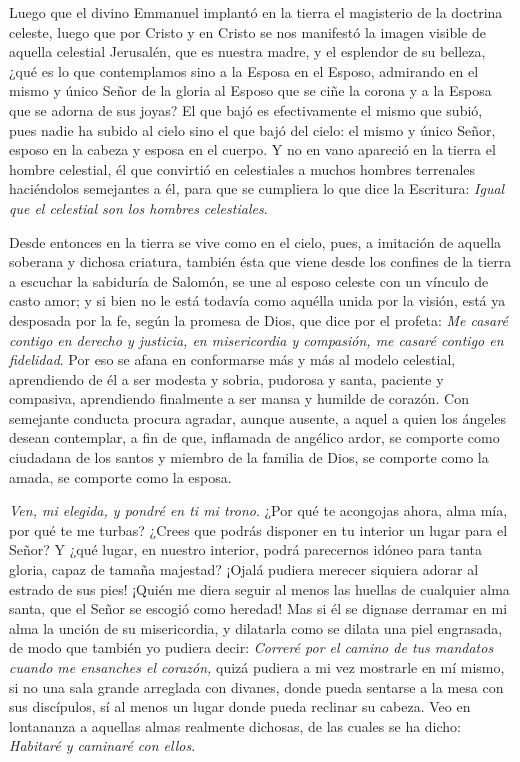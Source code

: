 				\begin{body}
					Luego que el divino Emmanuel implantó en la tierra el magisterio de la doctrina celeste, luego que por Cristo y en Cristo se nos manifestó la imagen visible de aquella celestial Jerusalén, que es nuestra madre, y el esplendor de su belleza, ¿qué es lo que contemplamos sino a la Esposa en el Esposo, admirando en el mismo y único Señor de la gloria al Esposo que se ciñe la corona y a la Esposa que se adorna de sus joyas? El que bajó es efectivamente el mismo que subió, pues nadie ha subido al cielo sino el que bajó del cielo: el mismo y único Señor, esposo en la cabeza y esposa en el cuerpo. Y no en vano apareció en la tierra el hombre celestial, él que convirtió en celestiales a muchos hombres terrenales haciéndolos semejantes a él, para que se cumpliera lo que dice la Escritura: \emph{Igual que el celestial son los hombres celestiales}.
					
					Desde entonces en la tierra se vive como en el cielo, pues, a imitación de aquella soberana y dichosa criatura, también ésta que viene desde los confines de la tierra a escuchar la sabiduría de Salomón, se une al esposo celeste con un vínculo de casto amor; y si bien no le está todavía como aquélla unida por la visión, está ya desposada por la fe, según la promesa de Dios, que dice por el profeta: \emph{Me casaré contigo en derecho y justicia, en misericordia y compasión, me casaré contigo en fidelidad}. Por eso se afana en conformarse más y más al modelo celestial, aprendiendo de él a ser modesta y sobria, pudorosa y santa, paciente y compasiva, aprendiendo finalmente a ser mansa y humilde de corazón. Con semejante conducta procura agradar, aunque ausente, a aquel a quien los ángeles desean contemplar, a fin de que, inflamada de angélico ardor, se comporte como ciudadana de los santos y miembro de la familia de Dios, se comporte como la amada, se comporte como la esposa.
					
					\emph{Ven, mi elegida, y pondré en ti mi trono}. ¿Por qué te acongojas ahora, alma mía, por qué te me turbas? ¿Crees que podrás disponer en tu interior un lugar para el Señor? Y ¿qué lugar, en nuestro interior, podrá parecernos idóneo para tanta gloria, capaz de tamaña majestad? ¡Ojalá pudiera merecer siquiera adorar al estrado de sus pies! ¡Quién me diera seguir al menos las huellas de cualquier alma santa, que el Señor se escogió como heredad! Mas si él se dignase derramar en mi alma la unción de su misericordia, y dilatarla como se dilata una piel engrasada, de modo que también yo pudiera decir: \emph{Correré por el camino de tus mandatos cuando me ensanches el corazón,} quizá pudiera a mi vez mostrarle en mí mismo, si no una sala grande arreglada con divanes, donde pueda sentarse a la mesa con sus discípulos, sí al menos un lugar donde pueda reclinar su cabeza. Veo en lontananza a aquellas almas realmente dichosas, de las cuales se ha dicho: \emph{Habitaré y caminaré con ellos}.
				\end{body}

